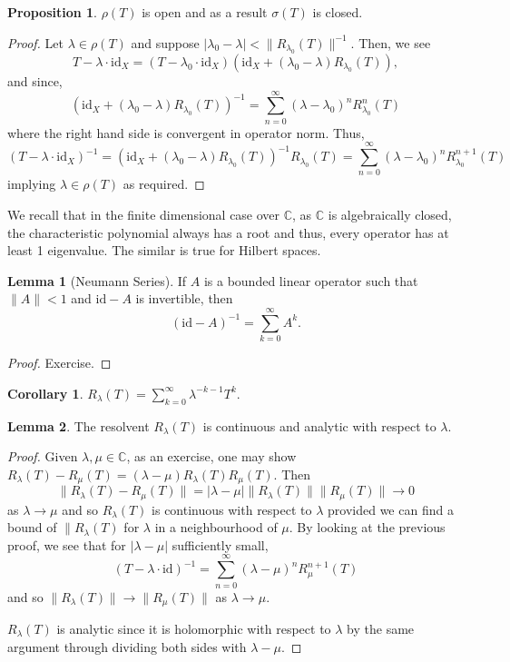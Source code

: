 \documentclass[]{article}
\theoremstyle{definition}
\theoremstyle{definition}
\newtheorem{lemma}{Lemma}[section]
\newtheorem{proposition}{Proposition}[section]
\newtheorem{corollary}{Corollary}[section]
\begin{document}
\begin{proposition}
  \(\rho(T)\) is open and as a result \(\sigma(T)\) is closed.
\end{proposition}
\begin{proof}
  Let \(\lambda \in \rho(T)\) and suppose \(|\lambda_0 - \lambda| < 
  \|R_{\lambda_0}(T)\|^{-1}\). Then, we see 
  \[T - \lambda \cdot \text{id}_X = (T - \lambda_0 \cdot \text{id}_X)
    (\text{id}_X + (\lambda_0 - \lambda)R_{\lambda_0}(T)),\]
  and since, 
  \[(\text{id}_X + (\lambda_0 - \lambda)R_{\lambda_0}(T))^{-1} = 
    \sum_{n = 0}^\infty (\lambda - \lambda_0)^nR_{\lambda_0}^n(T)\]
  where the right hand side is convergent in operator norm. Thus, 
  \[(T - \lambda \cdot \text{id}_X)^{-1} = 
  (\text{id}_X + (\lambda_0 - \lambda)R_{\lambda_0}(T))^{-1} R_{\lambda_0}(T) 
  = \sum_{n = 0}^\infty (\lambda - \lambda_0)^nR_{\lambda_0}^{n + 1}(T)\] 
  implying \(\lambda \in \rho(T)\) as required.
\end{proof}

We recall that in the finite dimensional case over \(\mathbb{C}\), as 
\(\mathbb{C}\) is algebraically closed, the characteristic polynomial 
always has a root and thus, every operator has at least 1 eigenvalue. 
The similar is true for Hilbert spaces.

\begin{lemma}[Neumann Series]
  If \(A\) is a bounded linear operator such that \(\|A\| < 1\) and 
  \(\text{id} - A\) is invertible, then 
  \[(\text{id} - A)^{-1} = \sum_{k = 0}^\infty A^k.\]
\end{lemma}
\begin{proof}
  Exercise.
\end{proof}

\begin{corollary}
  \(R_\lambda(T) = \sum_{k = 0}^\infty \lambda^{- k - 1} T^k.\)
\end{corollary}

\begin{lemma}
  The resolvent \(R_\lambda(T)\) is continuous and analytic with 
  respect to \(\lambda\).
\end{lemma}
\begin{proof}
  Given \(\lambda, \mu \in \mathbb{C}\), as an exercise, one may show 
  \(R_\lambda(T) - R_\mu(T) = (\lambda - \mu)R_\lambda(T) R_\mu(T)\).
  Then 
  \[\|R_\lambda(T) - R_\mu(T)\| = |\lambda - \mu| \|R_\lambda(T)\|\|R_\mu(T)\| \to 0\]
  as \(\lambda \to \mu\) and so \(R_\lambda(T)\) is continuous with respect 
  to \(\lambda\) provided we can find a bound of \(\|R_\lambda(T)\) for \(\lambda\) 
  in a neighbourhood of \(\mu\). By looking at the previous proof, we see that 
  for \(|\lambda - \mu|\) sufficiently small,
  \[(T - \lambda \cdot \text{id})^{-1} = 
  \sum_{n = 0}^\infty (\lambda - \mu)^nR_{\mu}^{n + 1}(T)\] 
  and so \(\|R_\lambda(T)\| \to \|R_\mu(T)\|\) as \(\lambda \to \mu\).

  \(R_\lambda(T)\) is analytic since it is holomorphic with respect to 
  \(\lambda\) by the same argument through dividing both sides with 
  \(\lambda - \mu\).
\end{proof}
\end{document}
